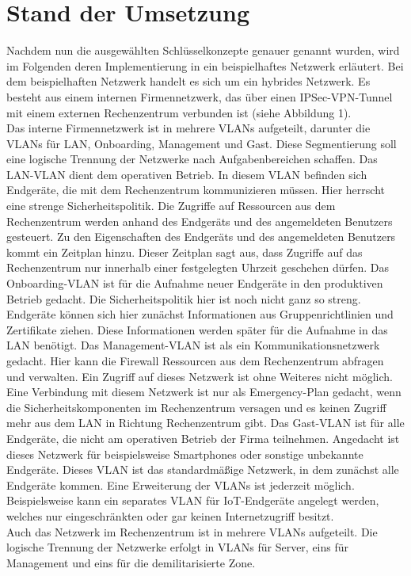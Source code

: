 \documentclass[lettersize,journal]{IEEEtran}
\begin{document}
\section{Stand der Umsetzung}
Nachdem nun die ausgewählten Schlüsselkonzepte genauer genannt wurden, wird im Folgenden deren Implementierung in ein beispielhaftes Netzwerk erläutert. Bei dem beispielhaften Netzwerk handelt es sich um ein hybrides Netzwerk. Es besteht aus einem internen Firmennetzwerk, das über einen IPSec-VPN-Tunnel mit einem externen Rechenzentrum verbunden ist (siehe Abbildung 1).\\
Das interne Firmennetzwerk ist in mehrere VLANs aufgeteilt, darunter die VLANs für LAN, Onboarding, Management und Gast. Diese Segmentierung soll eine logische Trennung der Netzwerke nach Aufgabenbereichen schaffen.
Das LAN-VLAN dient dem operativen Betrieb. In diesem VLAN befinden sich Endgeräte, die mit dem Rechenzentrum kommunizieren müssen. Hier herrscht eine strenge Sicherheitspolitik. Die Zugriffe auf Ressourcen aus dem Rechenzentrum werden anhand des Endgeräts und des angemeldeten Benutzers gesteuert. Zu den Eigenschaften des Endgeräts und des angemeldeten Benutzers kommt ein Zeitplan hinzu. Dieser Zeitplan sagt aus, dass Zugriffe auf das Rechenzentrum nur innerhalb einer festgelegten Uhrzeit geschehen dürfen.
Das Onboarding-VLAN ist für die Aufnahme neuer Endgeräte in den produktiven Betrieb gedacht. Die Sicherheitspolitik hier ist noch nicht ganz so streng. Endgeräte können sich hier zunächst Informationen aus Gruppenrichtlinien und Zertifikate ziehen. Diese Informationen werden später für die Aufnahme in das LAN benötigt.
Das Management-VLAN ist als ein Kommunikationsnetzwerk gedacht. Hier kann die Firewall Ressourcen aus dem Rechenzentrum abfragen und verwalten. Ein Zugriff auf dieses Netzwerk ist ohne Weiteres nicht möglich. Eine Verbindung mit diesem Netzwerk ist nur als Emergency-Plan gedacht, wenn die Sicherheitskomponenten im Rechenzentrum versagen und es keinen Zugriff mehr aus dem LAN in Richtung Rechenzentrum gibt.
Das Gast-VLAN ist für alle Endgeräte, die nicht am operativen Betrieb der Firma teilnehmen. Angedacht ist dieses Netzwerk für beispielsweise Smartphones oder sonstige unbekannte Endgeräte. Dieses VLAN ist das standardmäßige Netzwerk, in dem zunächst alle Endgeräte kommen.
Eine Erweiterung der VLANs ist jederzeit möglich. Beispielsweise kann ein separates VLAN für IoT-Endgeräte angelegt werden, welches nur eingeschränkten oder gar keinen Internetzugriff besitzt.\\
Auch das Netzwerk im Rechenzentrum ist in mehrere VLANs aufgeteilt. Die logische Trennung der Netzwerke erfolgt in VLANs für Server, eins für Management und eins für die demilitarisierte Zone.
\end{document}
